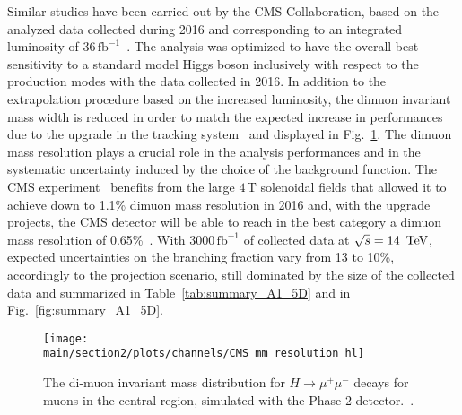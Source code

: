 Similar studies have been carried out by the CMS Collaboration, based on the analyzed data collected during 2016 and corresponding to an integrated luminosity of $36\,\text{fb}^{-1}$~\cite{HIG-17-019}. 
The analysis was optimized to have the overall best sensitivity to a standard model Higgs boson inclusively with respect to the production modes with the data collected in 2016.
In addition to the extrapolation procedure based on the increased luminosity, the dimuon invariant mass width is reduced in order to match the expected increase in performances due to the upgrade in the tracking system~\cite{Klein:2017nke} and displayed in Fig.~\ref{fig:cms_hmm_res_hl}. The dimuon mass resolution plays a crucial role in the analysis performances and in the systematic uncertainty induced by the choice of the background function. 
The CMS experiment~\cite{CMS} benefits from the large $4\,\text{T}$ solenoidal fields that allowed it to achieve down to 1.1\% dimuon mass resolution in 2016 and, with the upgrade projects, the CMS detector will be able to reach in the best category a dimuon mass resolution of 0.65\%~\cite{Klein:2017nke}.
With $3000\,\text{fb}^{-1}$ of collected data at $\sqrt{s} = 14\,~\text{TeV}$, expected uncertainties on the branching fraction vary from 13 to 10\%, accordingly to the projection scenario, still dominated by the size of the collected data and summarized in Table~\ref{tab:summary_A1_5D} and in Fig.~\ref{fig:summary_A1_5D}. 

\begin{figure}[h!]
\begin{center}
\texttt{[image: \\main/section2/plots/channels/CMS\_mm\_resolution\_hl]}
\end{center}
\caption{The di-muon invariant mass distribution for $H\rightarrow{}\mu^+\mu^-$ decays for muons in the
central region, simulated with the Phase-2 detector.~\protect\cite{Klein:2017nke}.}
\label{fig:cms_hmm_res_hl}
\end{figure}


